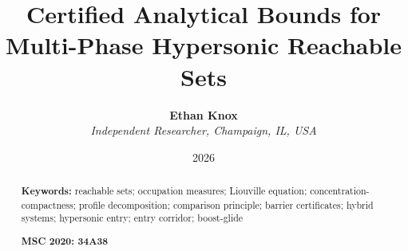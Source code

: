 \documentclass[english,11pt]{extarticle}
\begin{document}
\title{\textbf{Certified Analytical Bounds for Multi-Phase Hypersonic Reachable Sets}}
\author{\textbf{Ethan Knox}\\
\textit{Independent Researcher, Champaign, IL, USA}}
\date{2026}
\maketitle

\begin{abstract}

\bigskip{}

\textbf{Keywords:} reachable sets; occupation measures; Liouville equation;
concentration-compactness; profile decomposition; comparison principle;
barrier certificates; hybrid systems; hypersonic entry; entry corridor;
boost-glide

\medskip{}
\noindent\textbf{MSC 2020: 34A38}

\end{abstract}
\pagebreak{}

\tableofcontents{}
\pagebreak{}

\pagebreak{}


\pagebreak{}


\pagebreak{}


\pagebreak{}


\pagebreak{}


\pagebreak{}


\pagebreak{}


\pagebreak{}



\pagebreak{}

\appendix
\end{document}
